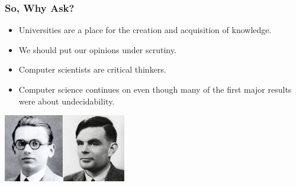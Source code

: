 \documentclass{beamer}
\begin{document}
\begin{frame}
  \frametitle{So, Why Ask?}
  \begin{itemize}
  \item<1-> Universities are a place for the creation and acquisition of knowledge.
  \item<2-> We should put our opinions under scrutiny.
  \item<3-> Computer scientists are critical thinkers.
  \item<4-> Computer science continues on even though many of the first major
    results were about undecidability.  
  \end{itemize}
  \pause
  \centering \includegraphics[width=0.4\textwidth]{images/turing-godel.jpeg}
\end{frame}
\end{document}
